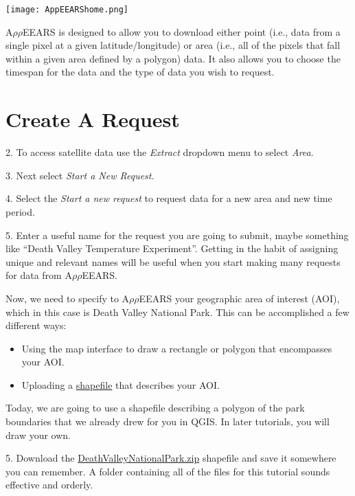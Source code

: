 \documentclass[oneside,a4paper,11pt,explicit]{book}
\begin{document}
\vspace{.5em}

\centerline{\texttt{[image: AppEEARShome.png]}}

A$\rho\rho$EEARS is designed to allow you to download either point (i.e., data from a single pixel at a given latitude/longitude) or area (i.e., all of the pixels that fall within a given area defined by a polygon) data. It also allows you to choose the timespan for the data and the type of data you wish to request.  

\section{Create A Request}
2. To access satellite data use the \textit{Extract} dropdown menu to select \textit{Area}. 

3. Next select \textit{Start a New Request}.

4. Select the \textit{Start a new request} to request data for a new area and new time period.

5. Enter a useful name for the request you are going to submit, maybe something like ``Death Valley Temperature Experiment''. Getting in the habit of assigning unique and relevant names will be useful when you start making many requests for data from A$\rho\rho$EEARS.

\vspace{1em}

Now, we need to specify to A$\rho\rho$EEARS your geographic area of interest (AOI), which in this case is Death Valley National Park. This can be accomplished a few different ways:

\begin{itemize}
	\item Using the map interface to draw a rectangle or polygon that encompasses your AOI.
	\item Uploading a \href{https://en.wikipedia.org/wiki/Shapefile}{shapefile} that describes your AOI.	
\end{itemize}

Today, we are going to use a shapefile describing a polygon of the park boundaries that we already drew for you in QGIS. In later tutorials, you will draw your own.

\vspace{1em}

5. Download the \href{https://jeremydforsythe.github.io/icecream-tutorials/Tutorial2_AccessingRemoteSensingDataWithAppears/DeathValleyNationalPark.zip}{DeathValleyNationalPark.zip} shapefile and save it somewhere you can remember. A folder containing all of the files for this tutorial sounds effective and orderly. 
\end{document}
